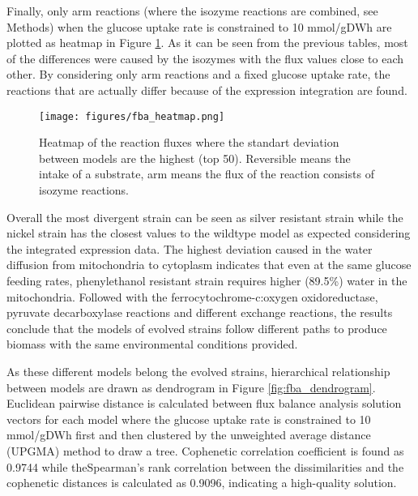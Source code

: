 

Finally, only arm reactions (where the isozyme reactions are combined, see Methods) when the glucose uptake rate is constrained to 10 mmol/gDWh are plotted as heatmap in Figure \ref{fig:fba_heatmap}. As it can be seen from the previous tables, most of the differences were caused by the isozymes with the flux values close to each other. By considering only arm reactions and a fixed glucose uptake rate, the reactions that are actually differ because of the expression integration are found.

\begin{figure}[H]
  \begin{center}
  \texttt{[image: figures/fba\_heatmap.png]}
  \caption[Heatmap of the reaction fluxes where the standart deviation between models are the highest (top 50). Reversible means the intake of a substrate, arm means the flux of the reaction consists of isozyme reactions]{Heatmap of the reaction fluxes where the standart deviation between models are the highest (top 50). Reversible means the intake of a substrate, arm means the flux of the reaction consists of isozyme reactions.}
  \label{fig:fba_heatmap}
  \end{center}
\end{figure}

Overall the most divergent strain can be seen as silver resistant strain while the nickel strain has the closest values to the wildtype model as expected considering the integrated expression data. The highest deviation caused in the water diffusion from mitochondria to cytoplasm indicates that even at the same glucose feeding rates, phenylethanol resistant strain requires higher (89.5\%) water in the mitochondria. Followed with the ferrocytochrome-c:oxygen oxidoreductase, pyruvate decarboxylase reactions and different exchange reactions, the results conclude that the models of evolved strains follow different paths to produce biomass with the same environmental conditions provided.

As these different models belong the evolved strains, hierarchical relationship between models are drawn as dendrogram in Figure \ref{fig:fba_dendrogram}. Euclidean pairwise distance is calculated between flux balance analysis solution vectors for each model where the glucose uptake rate is constrained to 10 mmol/gDWh first and then clustered by the unweighted average distance (UPGMA) method to draw a tree. Cophenetic correlation coefficient is found as 0.9744 while theSpearman's rank correlation between the dissimilarities and the cophenetic distances is calculated as 0.9096, indicating a high-quality solution.

